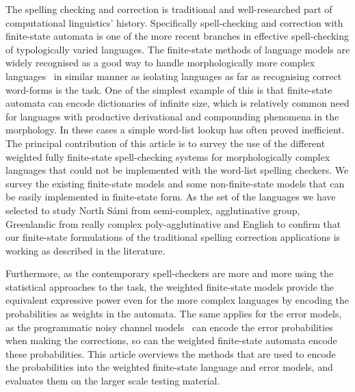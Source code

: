 \documentclass[a4paper,12pt]{article}
\begin{document}
The spelling checking and correction is traditional and well-researched part of
computational linguistics' history. Specifically spell-checking and correction
with finite-state automata is one of the more recent branches in effective
spell-checking of typologically varied languages. The finite-state methods of
language models are widely recognised as a good way to handle morphologically
more complex languages~\cite[]{beesley2003finite} in similar manner as
isolating languages as far as recognising correct word-forms is the task. One
of the simplest example of this is that finite-state automata can encode
dictionaries of infinite size, which is relatively common need for languages
with productive derivational and compounding phenomena in the morphology.  In
these cases a simple word-list lookup has often proved inefficient. The
principal contribution of this article is to survey the use of the different
weighted fully finite-state spell-checking systems for morphologically complex
languages that could not be implemented with the word-list spelling checkers.
We survey the existing finite-state models and some non-finite-state models
that can be easily implemented in finite-state form.  As the set of the
languages we have selected to study North Sámi from semi-complex, agglutinative
group, Greenlandic from really complex poly-agglutinative and English to
confirm that our finite-state formulations of the traditional spelling
correction applications is working as described in the literature.

Furthermore, as the contemporary spell-checkers are more and more using the
statistical approaches to the task, the weighted finite-state models provide
the equivalent expressive power even for the more complex languages by encoding
the probabilities as weights in the automata.  The same applies for the error
models, as the programmatic noisy channel models~\cite[]{brill2000improved} can
encode the error probabilities when making the corrections, so can the weighted
finite-state automata encode these probabilities. This article overviews the
methods that are used to encode the probabilities into the weighted
finite-state language and error models, and evaluates them on the larger scale
testing material.
\end{document}
